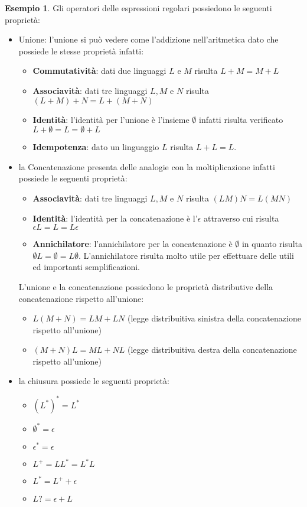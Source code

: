 \documentclass[a4paper]{book}
\theoremstyle{definition}%
\newtheorem*{esempio}{Esempio}
\begin{document}
\begin{esempio}
Gli operatori delle espressioni regolari possiedono le seguenti proprietà:
\begin{itemize}
\item Unione: l'unione si può vedere come l'addizione nell'aritmetica dato che possiede le stesse proprietà infatti:
  \begin{itemize}
  \item \textbf{Commutatività}: dati due linguaggi $L$ e $M$ risulta $L + M = M + L$
  \item \textbf{Associavità}: dati tre linguaggi $L, M$ e $N$ risulta $(L + M) + N = L + (M + N)$
  \item \textbf{Identità}: l'identità per l'unione è l'insieme $\emptyset$ infatti risulta verificato $L + \emptyset = L = \emptyset + L$
  \item \textbf{Idempotenza}: dato un linguaggio $L$ risulta $L + L = L$.
  \end{itemize}
\item la Concatenazione presenta delle analogie con la moltiplicazione infatti possiede le seguenti proprietà:
  \begin{itemize}
  \item \textbf{Associavità}: dati tre linguaggi $L, M$ e $N$ risulta $(LM)N = L(MN)$
  \item \textbf{Identità}: l'identità per la concatenazione è l'$\epsilon$ attraverso cui risulta $\epsilon L = L = L \epsilon$
  \item \textbf{Annichilatore}: l'annichilatore per la concatenazione è $\emptyset$ in quanto risulta $\emptyset L = \emptyset = L \emptyset$.
    L'annichilatore risulta molto utile per effettuare delle utili ed importanti semplificazioni.
  \end{itemize}
  L'unione e la concatenazione possiedono le proprietà distributive della concatenazione rispetto all'unione:
  \begin{itemize}
  \item $L(M + N) = LM + LN$ \quad (legge distribuitiva sinistra della concatenazione rispetto all'unione)
  \item $(M + N)L = ML + NL$ \quad (legge distribuitiva destra della concatenazione rispetto all'unione)
  \end{itemize}
\item la chiusura possiede le seguenti proprietà:
  \begin{itemize}
  \item $(L^*)^* = L^*$
  \item $\emptyset ^ * = \epsilon$
  \item $\epsilon ^ * = \epsilon$
  \item $L^+ = LL^* = L^* L$
  \item $L^* = L^+ + \epsilon$
  \item $L? = \epsilon + L$
  \end{itemize}
\end{itemize}


\end{esempio}
\end{document}
